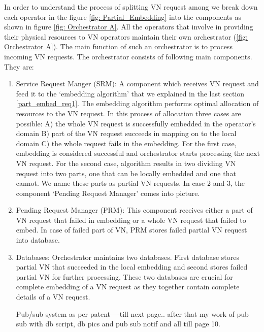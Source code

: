 \documentclass[article,dr=phil,type=msc ,colorback,accentcolor=tud4b]{tudthesis}
\begin{document}
In order to understand the process of splitting VN request among we break down each operator in the figure \ref{fig: Partial_Embedding} into the components as shown in figure \ref{fig: Orchestrator A}.  All the operators that involve in providing their physical resources to VN operators maintain their own orchestrator (\ref{fig: Orchestrator A}).  The main function of such an orchestrator is to process incoming VN requests. The orchestrator consists of following main components. They are:  
\begin{enumerate}
	\item  Service Request Manger (SRM): A component which receives VN request and feed it to the ‘embedding algorithm’ that we explained in the last section \ref{part_embed_req1}. The embedding algorithm performs optimal allocation of resources to the VN request. In this process of allocation three cases are possible:  A) the whole VN request is successfully embedded in the operator’s domain B) part of the VN request succeeds in mapping on to the local domain C) the whole request fails in the embedding.  For the first case, embedding is considered successful and orchestrator starts processing the next VN request. For the second case, algorithm results in two dividing VN request into two parts, one that can be locally embedded and one that cannot. We name these parts as partial VN requests. In case 2 and 3, the component ‘Pending Request Manager’ comes into picture.
	
	\item Pending Request Manager (PRM): This component receives either a part of VN request that failed in embedding or a whole VN request that failed to embed. In case of failed part of VN, PRM stores failed partial VN request into database. 
	\item Databases: Orchestrator maintains two databases. First database stores partial VN that succeeded in the local embedding and second stores failed partial VN for further processing. These two databases are crucial for complete embedding of a VN request as they together contain complete details of a VN request.	
	
	
	Pub/sub system as per patent----till next page..
	after that my work of pub sub with db script, db pics and pub sub notif and all till page 10.
\end{enumerate}



 
\newpage
 

\end{document}
